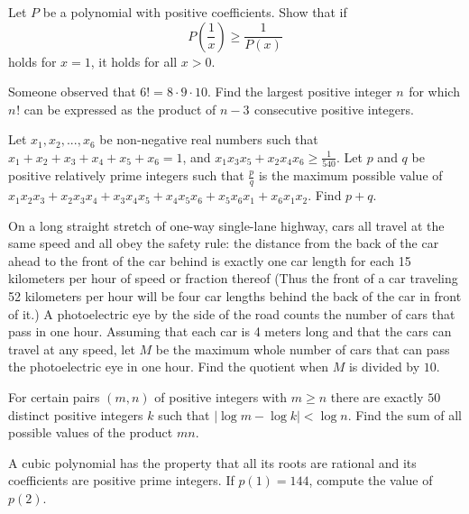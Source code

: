 \documentclass{article}
\begin{document}
\begin{prob}[Andreescu]{4}
Let $P$ be a polynomial with positive coefficients. Show that if \[P\left(\frac1x\right)\ge \frac1{P(x)}\] holds for $x=1$, it holds for all $x>0$. 
\end{prob} 

\begin{req}[AIME 1990/11]{6}
Someone observed that $6! = 8 \cdot 9 \cdot 10$. Find the largest positive integer $n^{}_{}$ for which $n^{}_{}!$ can be expressed as the product of $n - 3_{}^{}$ consecutive positive integers.
\end{req} 

\begin{prob}[AIME II 2011/9]{6}
Let $x_1, x_2, ... , x_6$ be non-negative real numbers such that $x_1 +x_2 +x_3 +x_4 +x_5 +x_6 =1$, and $x_1 x_3 x_5 +x_2 x_4 x_6 \ge {\scriptstyle\frac{1}{540}}$. Let $p$ and $q$ be positive relatively prime integers such that $\frac{p}{q}$ is the maximum possible value of $x_1 x_2 x_3 + x_2 x_3 x_4 +x_3 x_4 x_5 +x_4 x_5 x_6 +x_5 x_6 x_1 +x_6 x_1 x_2$. Find $p+q$.
\end{prob} 

\begin{req}[AIME I 2008/12]{6}
On a long straight stretch of one-way single-lane highway, cars all travel at the same speed and all obey the safety rule: the distance from the back of the car ahead to the front of the car behind is exactly one car length for each 15 kilometers per hour of speed or fraction thereof (Thus the front of a car traveling 52 kilometers per hour will be four car lengths behind the back of the car in front of it.) A photoelectric eye by the side of the road counts the number of cars that pass in one hour. Assuming that each car is 4 meters long and that the cars can travel at any speed, let $M$ be the maximum whole number of cars that can pass the photoelectric eye in one hour. Find the quotient when $M$ is divided by $10$.
\end{req} 

\begin{prob}[AIME II 2009/11]{9}
For certain pairs $(m,n)$ of positive integers with $m\geq n$ there are exactly $50$ distinct positive integers $k$ such that $|\log m - \log k| < \log n$. Find the sum of all possible values of the product $mn$.
\end{prob} 

\begin{prob}[]{9}
A cubic polynomial has the property that all its roots are rational and its coefficients are positive prime integers. If $p(1)=144$, compute the value of $p(2)$. 
\end{prob} 
\end{document}
